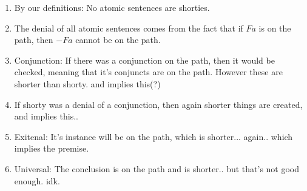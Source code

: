 \begin{enumerate}
\item By our definitions: No atomic sentences are shorties.
\item The denial of all atomic sentences comes from the fact that if $Fa$ is on the path, then $-Fa$ cannot be on the path.
\item Conjunction: If there was a conjunction on the path, then it would be checked, meaning that it's conjuncts are on the path. However these are shorter than shorty. and implies this(?)
\item If shorty was a denial of a conjunction, then again shorter things are created, and implies this.. 
\item Exitenal: It's instance will be on the path, which is shorter... again.. which implies the premise.
\item Universal: The conclusion is on the path and is shorter.. but that's not good enough. idk. 
\end{enumerate}



